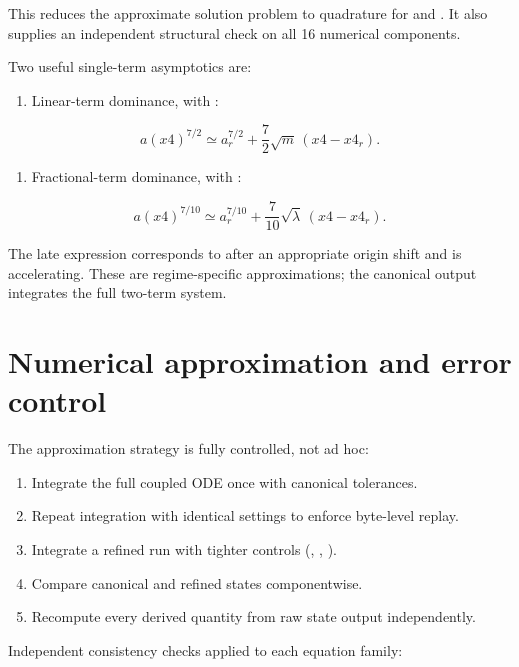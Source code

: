 \documentclass[11pt]{article}
\begin{document}
This reduces the approximate solution problem to quadrature for \texttt{} and \texttt{}. It also supplies an independent structural check on all 16 numerical components.

Two useful single-term asymptotics are:

\begin{enumerate}
\item Linear-term dominance, with \texttt{}:
\end{enumerate}

\[
a(x4)^{7/2}\simeq a_r^{7/2}
+\frac72\sqrt{m}\,(x4-x4_r).
\]

\begin{enumerate}
\item Fractional-term dominance, with \texttt{}:
\end{enumerate}

\[
a(x4)^{7/10}\simeq a_r^{7/10}
+\frac7{10}\sqrt{\lambda}\,(x4-x4_r).
\]

The late expression corresponds to \texttt{} after an appropriate origin shift and is accelerating. These are regime-specific approximations; the canonical output integrates the full two-term system.

\section{Numerical approximation and error control}

The approximation strategy is fully controlled, not ad hoc:

\begin{enumerate}
\item Integrate the full coupled ODE once with canonical tolerances.
\item Repeat integration with identical settings to enforce byte-level replay.
\item Integrate a refined run with tighter controls (\texttt{},
\texttt{}, \texttt{}).

\item Compare canonical and refined states componentwise.
\item Recompute every derived quantity from raw state output independently.
\end{enumerate}

Independent consistency checks applied to each equation family:
\end{document}
